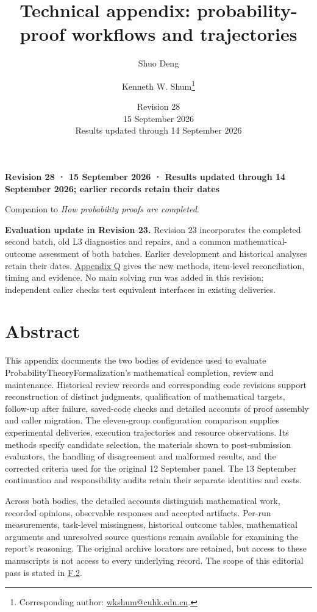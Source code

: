 
\title{Technical appendix: probability-proof workflows and trajectories}
\author{Shuo Deng \and Kenneth W. Shum\thanks{Corresponding author: \href{mailto:wkshum@cuhk.edu.cn}{wkshum@cuhk.edu.cn}.}}\date{Revision 28\\15 September 2026\\Results updated through 14 September 2026}
\maketitle
\textbf{Revision 28 · 15 September 2026 · Results updated through 14 September 2026; earlier records retain their dates}

Companion to \emph{How probability proofs are completed}.

\textbf{Evaluation update in Revision 23.} Revision 23 incorporates the completed second batch, old L3 diagnostics and repairs, and a common mathematical-outcome assessment of both batches. Earlier development and historical analyses retain their dates. \hyperlink{appendix-q}{Appendix Q} gives the new methods, item-level reconciliation, timing and evidence. No main solving run was added in this revision; independent caller checks test equivalent interfaces in existing deliveries.

\section*{\texorpdfstring{\protect\hypertarget{abstract}{}Abstract}{Abstract}}
This appendix documents the two bodies of evidence used to evaluate ProbabilityTheoryFormalization's mathematical completion, review and maintenance. Historical review records and corresponding code revisions support reconstruction of distinct judgments, qualification of mathematical targets, follow-up after failure, saved-code checks and detailed accounts of proof assembly and caller migration. The eleven-group configuration comparison supplies experimental deliveries, execution trajectories and resource observations. Its methods specify candidate selection, the materials shown to post-submission evaluators, the handling of disagreement and malformed results, and the corrected criteria used for the original 12 September panel. The 13 September continuation and responsibility audits retain their separate identities and costs.

Across both bodies, the detailed accounts distinguish mathematical work, recorded opinions, observable responses and accepted artifacts. Per-run measurements, task-level missingness, historical outcome tables, mathematical arguments and unresolved source questions remain available for examining the report's reasoning. The original archive locators are retained, but access to these manuscripts is not access to every underlying record. The scope of this editorial pass is stated in \hyperlink{f2}{F.2}.

